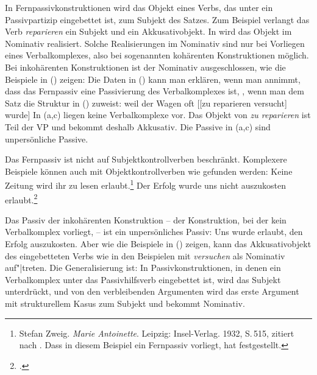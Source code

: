 In Fernpassivkonstruktionen wird das Objekt eines Verbs, das unter ein Passivpartizip eingebettet ist,
zum Subjekt des Satzes. Zum Beispiel verlangt das Verb \emph{reparieren} ein Subjekt und ein Akkusativobjekt.
In  wird das Objekt im Nominativ realisiert.
Solche Realisierungen im Nominativ sind nur bei Vorliegen eines Verbalkomplexes, also bei sogenannten
kohärenten Konstruktionen möglich. Bei inkohärenten Konstruktionen ist der Nominativ ausgeschlossen, wie die Beispiele in () zeigen:
\eal
{}
\zl
Die Daten in () kann man erklären, wenn man annimmt, dass das Fernpassiv eine Passivierung
des Verbalkomplexes ist, \dash, wenn man dem Satz 
die Struktur in () zuweist:
\ea
weil    der Wagen     oft   [[zu reparieren versucht] wurde]
%
\z
In (a,c) liegen keine Verbalkomplexe vor. Das Objekt von \emph{zu reparieren} ist Teil der VP
und bekommt deshalb Akkusativ. Die Passive in (a,c) sind unpersönliche Passive.

Das Fernpassiv ist nicht auf Subjektkontrollverben beschränkt. Komplexere Beispiele
können auch mit Objektkontrollverben wie  gefunden werden:
\eal
\label{bsp-auskosten-fernpassiv}
\ex{}\label{bsp-Zeitung-zu-lesen-erlaubt}
Keine Zeitung         wird ihr       zu lesen erlaubt.\footnote{
        Stefan Zweig. \emph{Marie Antoinette}. Leipzig: Insel-Verlag. 1932, S.\,515, 
        zitiert nach . 
        Dass in diesem Beispiel ein Fernpassiv vorliegt, hat \citet[]{Askedal88} festgestellt.
}
\ex{}
Der Erfolg        wurde uns      nicht auszukosten erlaubt.\footnote{
        .%
}
\label{bsp-auskosten-fernpassiv-haider}
\zl

\noindent
Das Passiv der inkohärenten Konstruktion -- der Konstruktion, 
bei der kein Verbalkomplex vorliegt, -- ist ein unpersönliches Passiv:
\eas
Uns wurde erlaubt, den Erfolg auszukosten.
\zs
Aber wie die Beispiele in () zeigen, kann das Akkusativobjekt des eingebetteten Verbs
wie in den Beispielen mit \emph{versuchen} als Nominativ auf"|treten.
Die Generalisierung ist: In Passivkonstruktionen, in denen ein Verbalkomplex unter das Passivhilfsverb
eingebettet ist, wird das Subjekt unterdrückt, und von den verbleibenden Argumenten
wird das erste Argument mit strukturellem Kasus
zum Subjekt und bekommt Nominativ.%

